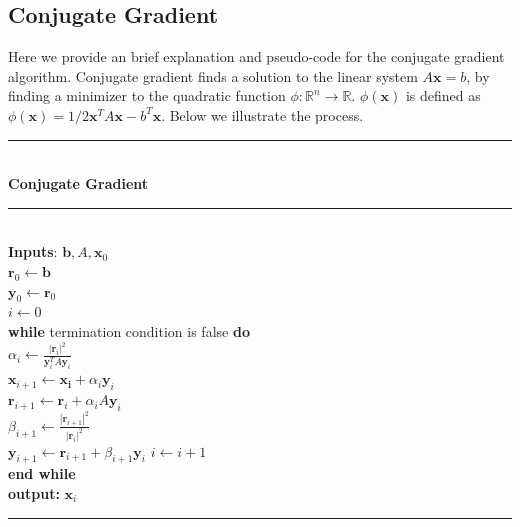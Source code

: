 \documentclass[]{article}
\newcommand{\abs}[1]{\left|#1\right|}
\newcommand{\B}[1]{\boldsymbol{#1}}
\newcommand{\R}{\mathbb{R}}
\newcommand{\tab}{\hspace*{.25in}}
\newcommand{\Hline}{\noindent\rule[0.5ex]{\linewidth}{.5pt}}
\theoremstyle{plain}
\theoremstyle{definition}
\newcommand{\algostart}[1]{\Hline\\\textbf{#1}\\\Hline\\}
\begin{document}
\subsection{Conjugate Gradient}
Here we provide an brief explanation and pseudo-code for the conjugate gradient algorithm. Conjugate gradient finds a solution to the linear system $ A\B{x} = b $, by finding a minimizer to the quadratic function $ \phi:\R^n \to \R $. $ \phi(\B{x}) $ is  defined as $ \phi(\B{x}) = 1/2\B{x}^TA\B{x}-b^T\B{x} $. Below we illustrate the process. 
\algostart{Conjugate Gradient}
\textbf{Inputs}: $ \B{b}, A, \B{x}_0 $\\
$ \B{r}_0 \leftarrow \B{b} $\\
$ \B{y}_0 \leftarrow \B{r}_0 $\\
$ i \leftarrow 0 $\\
\textbf{while} termination condition is false \textbf{do}\\
\tab$ \alpha_i \leftarrow \displaystyle\frac{\abs{\B{r}_i}^2}{\B{y}_i^TA\B{y}_i} $\\
\tab$ \B{x}_{i+1} \leftarrow \B{x_i} + \alpha_i\B{y}_i$\\
\tab$ \B{r}_{i+1} \leftarrow \B{r}_i + \alpha_iA\B{y}_i $\\
\tab$ \beta_{i+1}\leftarrow\displaystyle\frac{\abs{\B{r}_{i+1}}^2}{\abs{\B{r}_{i}}^2} $\\
\tab$ \B{y}_{i+1} \leftarrow \B{r}_{i+1}+\beta_{i+1}\B{y}_i $
\tab$ i\leftarrow i+1 $\\
\textbf{end while}\\
\textbf{output:} $ \B{x}_i $\\
\Hline
\end{document}
